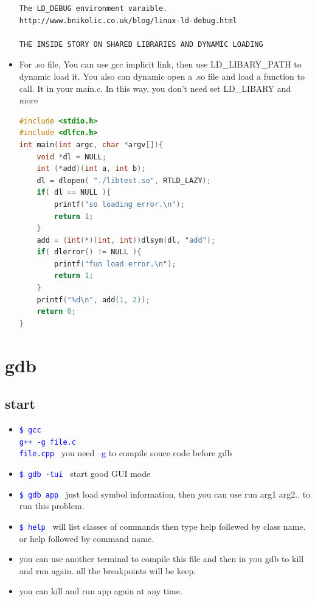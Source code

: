 \documentclass[a4paper,12pt,twoside]{book}
\newcommand{\linuxcommand}[1]{\texttt{\textcolor{blue}{\$ #1 \Pisymbol{psy}{191}}}}
\newcommand{\op}[1]{\textcolor{blue}{-#1}}
\begin{document}
\begin{itemize}
\begin{verbatim}
The LD_DEBUG environment varaible.
http://www.bnikolic.co.uk/blog/linux-ld-debug.html	

THE INSIDE STORY ON SHARED LIBRARIES AND DYNAMIC LOADING			
\end{verbatim}			
  	 

		\item For .so file, You can use gcc implicit link, then use LD\_LIBARY\_PATH to dynamic load it. You also can dynamic open a .so file and load a function to call. It in your main.c. In this way, you don't need set LD\_LIBARY and more 


\begin{lstlisting}[frame=single, language=c++]
#include <stdio.h>
#include <dlfcn.h>
int main(int argc, char *argv[]){
	void *dl = NULL;
	int (*add)(int a, int b);
	dl = dlopen( "./libtest.so", RTLD_LAZY);
	if( dl == NULL ){
		printf("so loading error.\n");
		return 1;
	}
    add = (int(*)(int, int))dlsym(dl, "add");
	if( dlerror() != NULL ){
        printf("fun load error.\n");
		return 1;
	}
	printf("%d\n", add(1, 2));
	return 0;
}
\end{lstlisting}

 \end{itemize}


\section{gdb}
\subsection{start}
\begin{itemize}
\item \linuxcommand{gcc\\g++ -g file.c\\file.cpp} you need \op{-g} to compile souce code before gdb

  \item \linuxcommand{gdb -tui} start good GUI mode

  \item \linuxcommand{gdb app} just load symbol information, then you can use run arg1 arg2.. to run this problem.
  \item \linuxcommand{help} will list classes of commands then type help follewed by class name.  or help followed by command name. 

  \item you can use another terminal to compile this file and then in you gdb to kill and run again. all the breakpoints will be keep.
		  
  \item you can kill and run app again at any time. 
 
\end{itemize}
\end{document}
